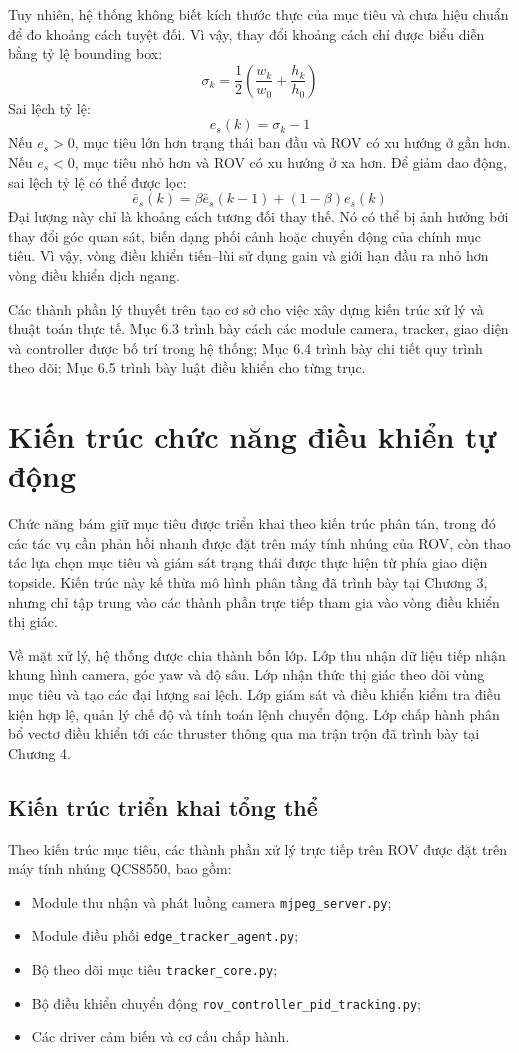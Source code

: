\documentclass[../DoAn.tex]{subfiles}
\begin{document}
Tuy nhiên, hệ thống không biết kích thước thực của mục tiêu và chưa hiệu chuẩn để đo khoảng cách tuyệt đối. Vì vậy, thay đổi khoảng cách chỉ được biểu diễn bằng tỷ lệ bounding box:
\[
\sigma_k = \frac{1}{2}\left(\frac{w_k}{w_0} + \frac{h_k}{h_0}\right)
\]
Sai lệch tỷ lệ:
\[
e_s(k) = \sigma_k - 1
\]
Nếu $e_s > 0$, mục tiêu lớn hơn trạng thái ban đầu và ROV có xu hướng ở gần hơn. Nếu $e_s < 0$, mục tiêu nhỏ hơn và ROV có xu hướng ở xa hơn. Để giảm dao động, sai lệch tỷ lệ có thể được lọc:
\[
\bar{e}_s(k) = \beta \bar{e}_s(k-1) + (1-\beta)e_s(k)
\]
Đại lượng này chỉ là khoảng cách tương đối thay thế. Nó có thể bị ảnh hưởng bởi thay đổi góc quan sát, biến dạng phối cảnh hoặc chuyển động của chính mục tiêu. Vì vậy, vòng điều khiển tiến--lùi sử dụng gain và giới hạn đầu ra nhỏ hơn vòng điều khiển dịch ngang.

Các thành phần lý thuyết trên tạo cơ sở cho việc xây dựng kiến trúc xử lý và thuật toán thực tế. Mục 6.3 trình bày cách các module camera, tracker, giao diện và controller được bố trí trong hệ thống; Mục 6.4 trình bày chi tiết quy trình theo dõi; Mục 6.5 trình bày luật điều khiển cho từng trục.

\section{Kiến trúc chức năng điều khiển tự động}

Chức năng bám giữ mục tiêu được triển khai theo kiến trúc phân tán, trong đó các tác vụ cần phản hồi nhanh được đặt trên máy tính nhúng của ROV, còn thao tác lựa chọn mục tiêu và giám sát trạng thái được thực hiện từ phía giao diện topside. Kiến trúc này kế thừa mô hình phân tầng đã trình bày tại Chương 3, nhưng chỉ tập trung vào các thành phần trực tiếp tham gia vào vòng điều khiển thị giác.

Về mặt xử lý, hệ thống được chia thành bốn lớp. Lớp thu nhận dữ liệu tiếp nhận khung hình camera, góc yaw và độ sâu. Lớp nhận thức thị giác theo dõi vùng mục tiêu và tạo các đại lượng sai lệch. Lớp giám sát và điều khiển kiểm tra điều kiện hợp lệ, quản lý chế độ và tính toán lệnh chuyển động. Lớp chấp hành phân bổ vectơ điều khiển tới các thruster thông qua ma trận trộn đã trình bày tại Chương 4.

\subsection{Kiến trúc triển khai tổng thể}

Theo kiến trúc mục tiêu, các thành phần xử lý trực tiếp trên ROV được đặt trên máy tính nhúng QCS8550, bao gồm:
\begin{itemize}
    \item Module thu nhận và phát luồng camera \texttt{mjpeg\_server.py};
    \item Module điều phối \texttt{edge\_tracker\_agent.py};
    \item Bộ theo dõi mục tiêu \texttt{tracker\_core.py};
    \item Bộ điều khiển chuyển động \texttt{rov\_controller\_pid\_tracking.py};
    \item Các driver cảm biến và cơ cấu chấp hành.
\end{itemize}
\end{document}

